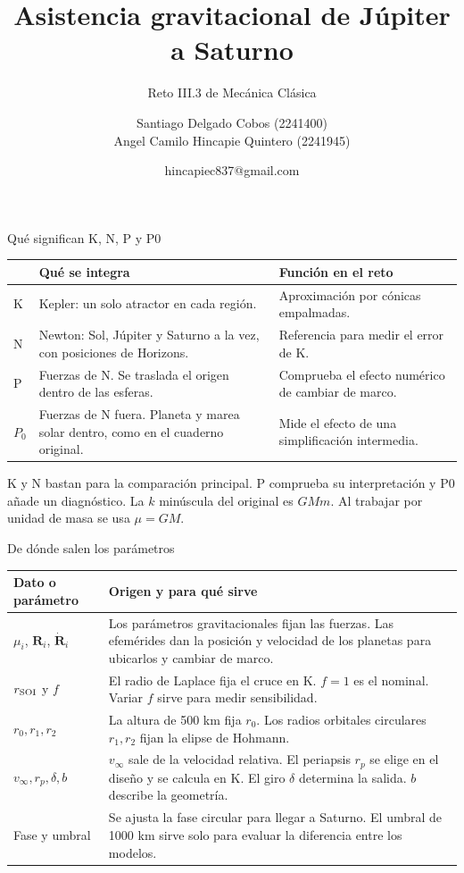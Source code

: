 \documentclass[aspectratio=169,11pt]{beamer}
\title{Asistencia gravitacional de Júpiter a Saturno}
\subtitle{Reto III.3 de Mecánica Clásica}
\author[Santiago Delgado y Angel Camilo Hincapie]{Santiago Delgado Cobos (2241400)\texorpdfstring{\\}{ y }Angel Camilo Hincapie Quintero (2241945)}
\institute{Universidad Industrial de Santander}
\date{hincapiec837@gmail.com}
\begin{document}
\frame{\titlepage}

\begin{frame}{Qué significan K, N, P y P0}
\small
\begin{tabular}{@{}p{.07\linewidth}p{.43\linewidth}p{.41\linewidth}@{}}
\toprule
 & Qué se integra & Función en el reto\\
\midrule
K & Kepler: un solo atractor en cada región. & Aproximación por cónicas empalmadas.\\[3pt]
N & Newton: Sol, Júpiter y Saturno a la vez, con posiciones de Horizons. & Referencia para medir el error de K.\\[3pt]
P & Fuerzas de N. Se traslada el origen dentro de las esferas. & Comprueba el efecto numérico de cambiar de marco.\\[3pt]
$P_0$ & Fuerzas de N fuera. Planeta y marea solar dentro, como en el cuaderno original. & Mide el efecto de una simplificación intermedia.\\
\bottomrule
\end{tabular}
\medskip

K y N bastan para la comparación principal. P comprueba su interpretación y P0 añade un diagnóstico. La $k$ minúscula del original es $GMm$. Al trabajar por unidad de masa se usa $\mu=GM$.
\end{frame}

\begin{frame}{De dónde salen los parámetros}
\small
\begin{tabular}{@{}p{.25\linewidth}p{.70\linewidth}@{}}
\toprule
Dato o parámetro & Origen y para qué sirve\\
\midrule
$\mu_i$, $\mathbf R_i$, $\dot{\mathbf R}_i$ & Los parámetros gravitacionales fijan las fuerzas. Las efemérides dan la posición y velocidad de los planetas para ubicarlos y cambiar de marco.\\[3pt]
$r_{\rm SOI}$ y $f$ & El radio de Laplace fija el cruce en K. $f=1$ es el nominal. Variar $f$ sirve para medir sensibilidad.\\[3pt]
$r_0,r_1,r_2$ & La altura de 500 km fija $r_0$. Los radios orbitales circulares $r_1,r_2$ fijan la elipse de Hohmann.\\[3pt]
$v_\infty,r_p,\delta,b$ & $v_\infty$ sale de la velocidad relativa. El periapsis $r_p$ se elige en el diseño y se calcula en K. El giro $\delta$ determina la salida. $b$ describe la geometría.\\[3pt]
Fase y umbral & Se ajusta la fase circular para llegar a Saturno. El umbral de 1000 km sirve solo para evaluar la diferencia entre los modelos.\\
\bottomrule
\end{tabular}
\end{frame}
\end{document}
